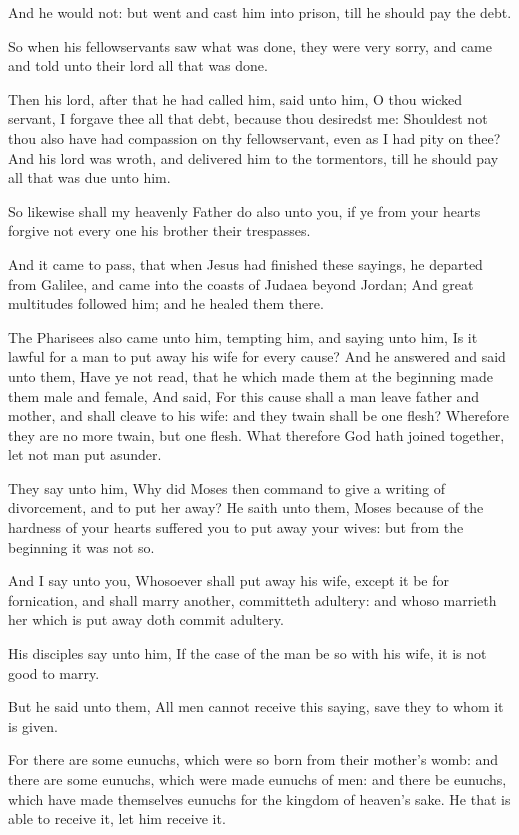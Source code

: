 \Verse And he would not: but went and cast him into prison, till he should pay the debt.

\Verse So when his fellowservants saw what was done, they were very sorry, and came and told unto their lord all that was done.

\Verse Then his lord, after that he had called him, said unto him, O thou wicked servant, I forgave thee all that debt, because thou desiredst me: \Verse Shouldest not thou also have had compassion on thy fellowservant, even as I had pity on thee?  \Verse And his lord was wroth, and delivered him to the tormentors, till he should pay all that was due unto him.

\Verse So likewise shall my heavenly Father do also unto you, if ye from your hearts forgive not every one his brother their trespasses.


\Chapter
\Verse And it came to pass, that when Jesus had finished these sayings, he departed from Galilee, and came into the coasts of Judaea beyond Jordan; \Verse And great multitudes followed him; and he healed them there.

\Verse The Pharisees also came unto him, tempting him, and saying unto him, Is it lawful for a man to put away his wife for every cause?  \Verse And he answered and said unto them, Have ye not read, that he which made them at the beginning made them male and female, \Verse And said, For this cause shall a man leave father and mother, and shall cleave to his wife: and they twain shall be one flesh?  \Verse Wherefore they are no more twain, but one flesh. What therefore God hath joined together, let not man put asunder.

\Verse They say unto him, Why did Moses then command to give a writing of divorcement, and to put her away?  \Verse He saith unto them, Moses because of the hardness of your hearts suffered you to put away your wives: but from the beginning it was not so.

\Verse And I say unto you, Whosoever shall put away his wife, except it be for fornication, and shall marry another, committeth adultery: and whoso marrieth her which is put away doth commit adultery.

\Verse His disciples say unto him, If the case of the man be so with his wife, it is not good to marry.

\Verse But he said unto them, All men cannot receive this saying, save they to whom it is given.

\Verse For there are some eunuchs, which were so born from their mother's womb: and there are some eunuchs, which were made eunuchs of men: and there be eunuchs, which have made themselves eunuchs for the kingdom of heaven's sake. He that is able to receive it, let him receive it.

